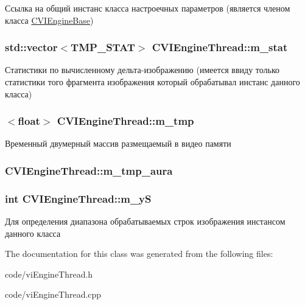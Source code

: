 Ссылка на общий инстанс класса настроечных параметров (является членом класса \hyperlink{class_c_v_i_engine_base}{C\+V\+I\+Engine\+Base}) 

\hypertarget{class_c_v_i_engine_thread_aa356e0ebc6490ee932679fb7ca5021b5}{
\subsubsection[{m\+\_\+stat}]{\setlength{\rightskip}{0pt plus 5cm}std\+::vector$<${\bf T\+M\+P\+\_\+\+S\+T\+A\+T}$>$ C\+V\+I\+Engine\+Thread\+::m\+\_\+stat}}\label{class_c_v_i_engine_thread_aa356e0ebc6490ee932679fb7ca5021b5}


Статистики по вычисленному дельта-\/изображению (имеется ввиду только статистики того фрагмента изображения который обрабатывал инстанс данного класса) 

\hypertarget{class_c_v_i_engine_thread_af213b9d425f314412e3de05774960c3f}{
\subsubsection[{m\+\_\+tmp}]{$<$float$>$ C\+V\+I\+Engine\+Thread\+::m\+\_\+tmp}}\label{class_c_v_i_engine_thread_af213b9d425f314412e3de05774960c3f}


Временный двумерный массив размещаемый в видео памяти 

\hypertarget{class_c_v_i_engine_thread_a6ffad2b9d46d3d237d194b7d07720f6b}{
\subsubsection[{m\+\_\+tmp\+\_\+aura}]{ C\+V\+I\+Engine\+Thread\+::m\+\_\+tmp\+\_\+aura}}\label{class_c_v_i_engine_thread_a6ffad2b9d46d3d237d194b7d07720f6b}




\hypertarget{class_c_v_i_engine_thread_a19834ce7dacd0ff5d1cc4615c040830c}{
\subsubsection[{m\+\_\+y\+S}]{\setlength{\rightskip}{0pt plus 5cm}int C\+V\+I\+Engine\+Thread\+::m\+\_\+y\+S}}\label{class_c_v_i_engine_thread_a19834ce7dacd0ff5d1cc4615c040830c}


Для определения диапазона обрабатываемых строк изображения инстансом данного класса 



The documentation for this class was generated from the following files\+:\begin{DoxyCompactItemize}
\item 
code/vi\+Engine\+Thread.\+h\item 
code/vi\+Engine\+Thread.\+cpp\end{DoxyCompactItemize}
